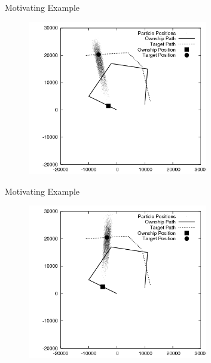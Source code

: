\documentclass{beamer}
\begin{document}

\begin{frame}{Motivating Example}
\begin{figure}
\centering
\includegraphics[width=0.7\textwidth]{data/azimuth_only_300.png}
\end{figure}
\end{frame}


\begin{frame}{Motivating Example}
\begin{figure}
\centering
\includegraphics[width=0.7\textwidth]{data/azimuth_only_500.png}
\end{figure}
\end{frame}

\end{document}
